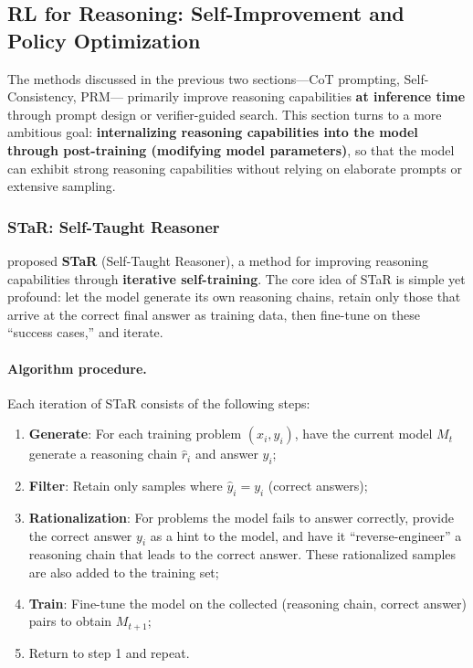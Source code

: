 

\subsection{RL for Reasoning: Self-Improvement and Policy Optimization}
\label{sec:t4-rl}

The methods discussed in the previous two sections---CoT prompting, Self-Consistency, PRM---
primarily improve reasoning capabilities \textbf{at inference time} through prompt design or verifier-guided search.
This section turns to a more ambitious goal:
\textbf{internalizing reasoning capabilities into the model through post-training (modifying model parameters)},
so that the model can exhibit strong reasoning capabilities without relying on elaborate prompts or extensive sampling.

\subsubsection{STaR: Self-Taught Reasoner}
\label{sec:t4-star}

 proposed \textbf{STaR} (Self-Taught Reasoner),
a method for improving reasoning capabilities through \textbf{iterative self-training}.
The core idea of STaR is simple yet profound:
let the model generate its own reasoning chains, retain only those that arrive at the correct final answer as training data,
then fine-tune on these ``success cases,'' and iterate.

\paragraph{Algorithm procedure.}
Each iteration of STaR consists of the following steps:
\begin{enumerate}[leftmargin=2em]
  \item \textbf{Generate}: For each training problem $(x_i, y_i)$,
    have the current model $M_t$ generate a reasoning chain $\hat{r}_i$ and answer $\hat{y}_i$;
  \item \textbf{Filter}: Retain only samples where $\hat{y}_i = y_i$ (correct answers);
  \item \textbf{Rationalization}: For problems the model fails to answer correctly,
    provide the correct answer $y_i$ as a hint to the model,
    and have it ``reverse-engineer'' a reasoning chain that leads to the correct answer.
    These rationalized samples are also added to the training set;
  \item \textbf{Train}: Fine-tune the model on the collected (reasoning chain, correct answer) pairs
    to obtain $M_{t+1}$;
  \item Return to step 1 and repeat.
\end{enumerate}


